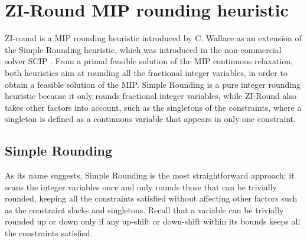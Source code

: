 \documentclass[a4paper,12pt]{book}
\begin{document}
\tableofcontents

\mainmatter


\chapter{ZI-Round MIP rounding heuristic} \label{ch:ziround}

ZI-round is a MIP rounding heuristic introduced by C. Wallace \cite{wallace2010} as an extension of the Simple Rounding heuristic, which was introduced in the non-commercial solver SCIP \cite{scip}.
From a primal feasible solution of the MIP continuous relaxation, both heuristics aim at rounding all the fractional integer variables, in order to obtain a feasible solution of the MIP. Simple Rounding is a pure integer rounding heuristic because it only rounds fractional integer variables, while ZI-Round also takes other factors into account, such as the singletons of the constraints, where a singleton is defined as a continuous variable that appears in only one constraint. \par

\section{Simple Rounding}
As its name suggests, Simple Rounding is the most straightforward approach: it scans the integer variables once and only rounds those that can be trivially rounded, keeping all the constraints satisfied without affecting other factors such as the constraint slacks and singletons.
Recall that a variable can be trivially rounded up or down only if any up-shift or down-shift within its bounds keeps all the constraints satisfied. \par
\end{document}
